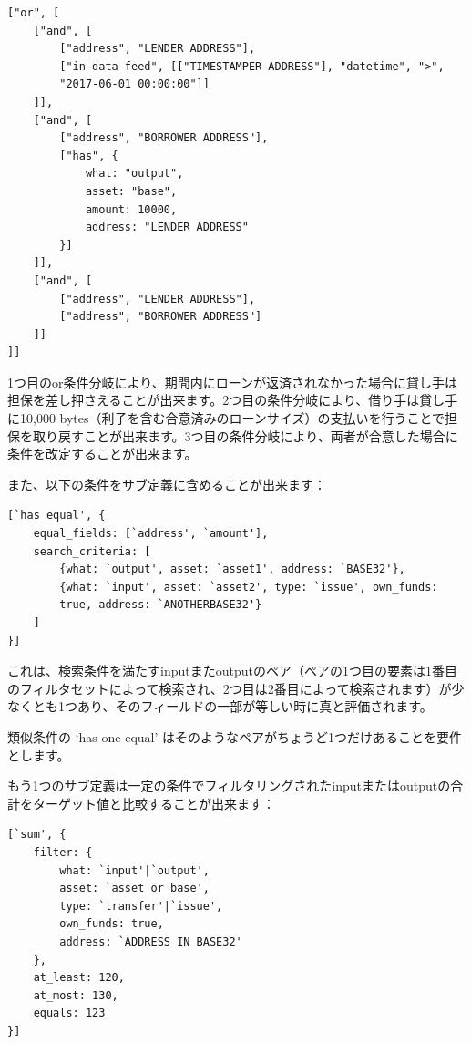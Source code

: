\documentclass[a4paper, dvipdfmx]{jsarticle}
\begin{document}
\begin{lstlisting}[basicstyle=\ttfamily\footnotesize, frame=none]
["or", [
    ["and", [
        ["address", "LENDER ADDRESS"],
        ["in data feed", [["TIMESTAMPER ADDRESS"], "datetime", ">",
        "2017-06-01 00:00:00"]]
    ]],
    ["and", [
        ["address", "BORROWER ADDRESS"],
        ["has", {
            what: "output",
            asset: "base",
            amount: 10000,
            address: "LENDER ADDRESS"
        }]
    ]],
    ["and", [
        ["address", "LENDER ADDRESS"],
        ["address", "BORROWER ADDRESS"]
    ]]
]]
\end{lstlisting}

\noindent 1つ目のor条件分岐により、期間内にローンが返済されなかった場合に貸し手は担保を差し押さえることが出来ます。2つ目の条件分岐により、借り手は貸し手に10,000 bytes（利子を含む合意済みのローンサイズ）の支払いを行うことで担保を取り戻すことが出来ます。3つ目の条件分岐により、両者が合意した場合に条件を改定することが出来ます。

また、以下の条件をサブ定義に含めることが出来ます：

\begin{lstlisting}[basicstyle=\ttfamily\footnotesize, frame=none]
[`has equal', {
    equal_fields: [`address', `amount'],
    search_criteria: [
        {what: `output', asset: `asset1', address: `BASE32'},
        {what: `input', asset: `asset2', type: `issue', own_funds:
        true, address: `ANOTHERBASE32'}
    ]
}]
\end{lstlisting}

\noindent これは、検索条件を満たすinputまたoutputのペア（ペアの1つ目の要素は1番目のフィルタセットによって検索され、2つ目は2番目によって検索されます）が少なくとも1つあり、そのフィールドの一部が等しい時に真と評価されます。

類似条件の ‘has one equal’ はそのようなペアがちょうど1つだけあることを要件とします。

もう1つのサブ定義は一定の条件でフィルタリングされたinputまたはoutputの合計をターゲット値と比較することが出来ます：

\begin{lstlisting}[basicstyle=\ttfamily\footnotesize, frame=none]
[`sum', {
    filter: {
        what: `input'|`output',
        asset: `asset or base',
        type: `transfer'|`issue',
        own_funds: true,
        address: `ADDRESS IN BASE32'
    },
    at_least: 120,
    at_most: 130,
    equals: 123
}]
\end{lstlisting}
\end{document}

